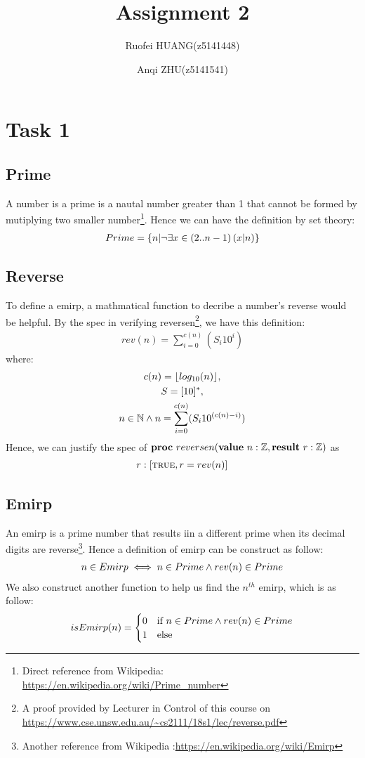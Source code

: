 \documentclass[a4paper,12pt,fleqn]{scrartcl}
\title{Assignment 2}
\author{Ruofei HUANG(z5141448)\and
Anqi ZHU(z5141541)
}
\begin{document}
\maketitle
\section{Task 1}
\subsection{Prime }
A number is a prime is a nautal number greater than 1 that 
cannot be formed by mutiplying two smaller number\footnote{
Direct reference from Wikipedia:
\url{https://en.wikipedia.org/wiki/Prime_number}}.
Hence we can have the definition by set theory:
\begin{gather*}
  Prime = \{ n | \neg \exists x\in (2..n-1)\left(x|n\right) \}
\end{gather*} 

\subsection{Reverse}
To define a emirp, a mathmatical function to decribe a number's reverse
would be helpful. 
By the spec in verifying reversen\footnote{A 
proof provided by Lecturer in Control of this course on 
\url{https://www.cse.unsw.edu.au/~cs2111/18s1/lec/reverse.pdf} },
we have this definition:
\begin{gather*}
  rev(n) = \sum_{i= 0}^{c(n)}(S_i 10^i)
\end{gather*}
where:
\begin{gather*}
  c(n) = \lfloor log_{10}(n)\rfloor ,\\
  S = [10]^* ,\\
  n \in \mathbb{N} \wedge n = \sum_{i=0}^{c(n)}(S_i 10 ^{(c(n)-i)})
\end{gather*}
Hence, we can justify the spec of 
$\text{\normalfont\bfseries proc} \ reversen(\text{\normalfont\bfseries value} \ n: \mathbb{Z}, \text{\normalfont\bfseries result} \ r: \mathbb{Z} )$ 
as 
\begin{gather*}
  r:[\text{\textsc{true}}, r = rev(n)]
\end{gather*}


\subsection{Emirp}
An emirp is a prime number that results iin a different prime when its 
decimal digits are reverse\footnote{
  Another reference from Wikipedia :\url{https://en.wikipedia.org/wiki/Emirp}
}. Hence a definition of emirp can be construct as follow:
\begin{gather*}
  n \in Emirp \iff n \in Prime \wedge rev(n) \in Prime 
\end{gather*}
We also construct another function to help us find the $n^{th}$ emirp, 
which is as follow:
\begin{gather*}
  isEmirp(n)= \begin{cases}
    0 & \text{if } n \in Prime \wedge rev(n) \in Prime \\
    1 & \text{else }
  \end{cases}
\end{gather*}
\end{document}
